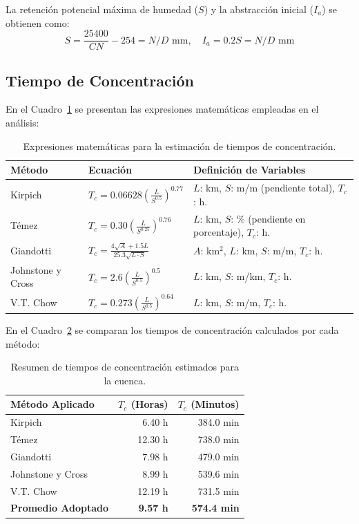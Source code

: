\documentclass[11pt,a4paper]{article}
\begin{document}
La retención potencial máxima de humedad ($S$) y la abstracción inicial ($I_a$) se obtienen como:
\begin{equation}
S = \frac{25400}{CN} - 254 = N/D \text{ mm}, \quad I_a = 0.2 S = N/D \text{ mm}
\end{equation}



\subsection{Tiempo de Concentración}
En el Cuadro~\ref{tab:expresiones_tc} se presentan las expresiones matemáticas empleadas en el análisis:

\begin{table}[H]
\centering
\caption{Expresiones matemáticas para la estimación de tiempos de concentración.}
\label{tab:expresiones_tc}
\begin{tabular}{p{3.2cm}p{5.0cm}p{6.8cm}}\toprule
\textbf{Método} & \textbf{Ecuación} & \textbf{Definición de Variables} \\\midrule
Kirpich & $T_c = 0.06628 \left(\frac{L}{S^{0.5}}\right)^{0.77}$ & $L$: km, $S$: m/m (pendiente total), $T_c$: h. \\
Témez & $T_c = 0.30 \left(\frac{L}{S^{0.25}}\right)^{0.76}$ & $L$: km, $S$: \% (pendiente en porcentaje), $T_c$: h. \\
Giandotti & $T_c = \frac{4\sqrt{A} + 1.5 L}{25.3 \sqrt{L \cdot S}}$ & $A$: km$^2$, $L$: km, $S$: m/m, $T_c$: h. \\
Johnstone y Cross & $T_c = 2.6 \left(\frac{L}{S^{0.5}}\right)^{0.5}$ & $L$: km, $S$: m/km, $T_c$: h. \\
V.T. Chow & $T_c = 0.273 \left(\frac{L}{S^{0.5}}\right)^{0.64}$ & $L$: km, $S$: m/m, $T_c$: h. \\
\bottomrule
\end{tabular}
\end{table}

En el Cuadro~\ref{tab:tc_resultados} se comparan los tiempos de concentración calculados por cada método:

\begin{table}[H]
\centering
\caption{Resumen de tiempos de concentración estimados para la cuenca.}
\label{tab:tc_resultados}
\begin{tabular}{lrr}\toprule
\textbf{Método Aplicado} & \textbf{$T_c$ (Horas)} & \textbf{$T_c$ (Minutos)} \\\midrule
Kirpich & 6.40 h & 384.0 min \\
Témez & 12.30 h & 738.0 min \\
Giandotti & 7.98 h & 479.0 min \\
Johnstone y Cross & 8.99 h & 539.6 min \\
V.T. Chow & 12.19 h & 731.5 min \\
\midrule
\textbf{Promedio Adoptado} & \textbf{9.57 h} & \textbf{574.4 min} \\
\bottomrule
\end{tabular}
\end{table}
\end{document}
